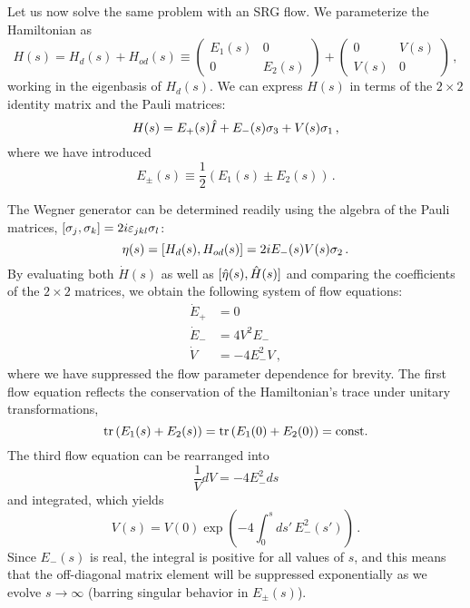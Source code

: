 {Let us now solve the same problem with an SRG flow. We parameterize the Hamiltonian
as
\begin{equation}
  H(s) = H_d(s) + H_{od}(s) \equiv \begin{pmatrix}E_1(s) & 0 \\ 0 & E_2(s)\end{pmatrix} + 
         \begin{pmatrix} 0 & V(s) \\ V(s) & 0\end{pmatrix}\,,
\end{equation}
working in the eigenbasis of $H_d(s)$. We can express $H(s)$ in terms of the $2\times2$ 
identity matrix and the Pauli matrices:
\begin{equation}
  H(s) = E_{+}(s) \hat{I} + E_{-}(s)\sigma_3 
         + V(s)\sigma_1\,,
\end{equation}
where we have introduced
\begin{equation}
  E_{\pm}(s) \equiv \frac{1}{2}\left(E_1(s) \pm E_2(s)\right)\,.
\end{equation}

The Wegner generator can be determined readily using the algebra of
the Pauli matrices,
$[{\sigma_j},{\sigma_k}]=2i\varepsilon_{jkl}\sigma_l$:
\begin{equation}
  \eta(s) = [{H_d(s)},{H_{od}(s)}] = 2 i E_{-}(s) V(s) \sigma_2\,.
\end{equation}
By evaluating both $\dot{H}(s)$ as well as $[{\hat{\eta}(s)},{\hat{H}(s)}]$
and comparing the coefficients of the $2\times2$ matrices, we obtain the
following system of flow equations:
\begin{align}
  \dot{E}_+ & = 0 \label{eq:flow_Eplus}\\
  \dot{E}_{-} &= 4 V^2 E_{-} \label{eq:flow_Eminus}\\
  \dot{V}     &= -4 E_{-}^2V \label{eq:flow_V}\,,
\end{align}
where we have suppressed the flow parameter dependence for brevity.
The first flow equation reflects the conservation of the Hamiltonian's
trace under unitary transformations,
\begin{equation}
  \mathrm{tr}\, (E_1(s) + E_2(s)) = \mathrm{tr}\, (E_1(0) + E_2(0)) = \text{const.}
\end{equation} 
The third flow equation can be rearranged into
\begin{equation}
  \frac{1}{V}dV = - 4 E_{-}^2 ds
\end{equation}
and integrated, which yields
\begin{equation}
  V(s) = V(0)\exp\left(-4\int_0^sds'\,E^2_{-}(s') \right)\,.
\end{equation}
Since $E_{-}(s)$ is real, the integral is positive for all values
of $s$, and this means that the off-diagonal matrix element will 
be suppressed exponentially as we evolve $s\to\infty$ (barring
singular behavior in $E_{\pm}(s)$).

}
